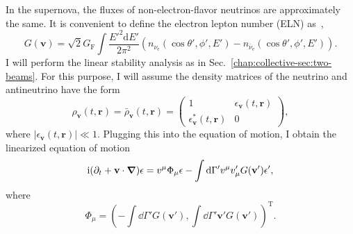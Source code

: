 In the supernova, the fluxes of non-electron-flavor neutrinos are approximately the same. It is convenient to define the electron lepton number (ELN) as~\cite{Izaguirre2016a},
\begin{equation}
G({\mathbf v}) =  \sqrt{2}G_{\mathrm F} \int \frac{E'^2 \mathrm d E'}{2\pi^2} ( n_{\nu_{\mathrm e}}(\cos\theta',\phi',E')  - n_{\bar\nu_{\mathrm e}}(\cos\theta',\phi',E')  ).
\end{equation}
I will perform the linear stability analysis as in Sec.~\ref{chap:collective-sec:two-beams}. For this purpose, I will assume the density matrices of the neutrino and antineutrino have the form
\begin{equation}
\rho_{\mathbf v} (t,\mathbf r)   = \bar \rho_{\mathbf v}  (t,\mathbf r)  = \begin{pmatrix}
1 & \epsilon_{\mathbf v}(t,\mathbf r) \\
\epsilon^*_{\mathbf v}(t,\mathbf r) & 0
\end{pmatrix},
\end{equation}
where $\lvert \epsilon_{\mathbf v}(t,\mathbf r) \rvert \ll 1$. Plugging this into the equation of motion, I obtain the linearized equation of motion
\begin{equation}
    \ri ( \partial_t + \mathbf v \cdot \boldsymbol{\nabla} ) \epsilon = v^\mu \Phi_\mu \epsilon - \int \dd \Gamma' v^\mu v'_\mu G(\mathbf v') \epsilon',
    \label{chap:collective-sec:fast-mode-eqn:eom-continuous-general-linearized}
\end{equation}
where
\begin{equation}
    \Phi_\mu = \left( -\int \dd \Gamma' G(\mathbf v'), \int \dd \Gamma' \mathbf v' G(\mathbf v') \right)^{\mathrm T}.
\end{equation}
